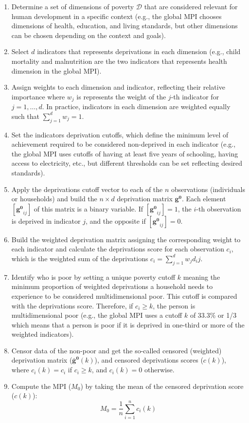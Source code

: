 \begin{enumerate}
\item Determine a set of dimensions of poverty $\mathcal{D}$ that are considered relevant for human development in a specific context (e.g., the global MPI chooses dimensions of health, education, and living standards, but other dimensions can be chosen depending on the context and goals).
\item Select $d$ indicators that represents deprivations in each dimension (e.g., child mortality and malnutrition are the two indicators that represents health dimension in the global MPI).  
\item Assign weights to each dimension and indicator, reflecting their relative importance where $w_j$ is represents the weight of the $j$-th indicator for $j = 1,\ldots,d$. In practice, indicators in each dimension are weighted equally such that $\sum_{j=1}^d w_j = 1$.
\item Set the indicators deprivation cutoffs, which define the minimum level of achievement required to be considered non-deprived in each indicator (e.g., the global MPI uses cutoffs of having at least five years of schooling, having access to electricity, etc., but different thresholds can be set reflecting desired standards). 
\item Apply the deprivations cutoff vector to each of the $n$ observations (individuals or households) and build the $n \times d$ deprivation matrix $\mathbf{g^0}$. Each element $\left[ \mathbf{g^0}_{ij} \right]$ of this matrix is a binary variable. If $\left[ \mathbf{g^0}_{ij} \right] = 1$, the $i$-th observation is deprived in indicator $j$, and the opposite if $\left[ \mathbf{g^0}_{ij} \right] = 0$. 
\item Build the weighted deprivation matrix assigning the corresponding weight to each indicator and calculate the deprivations score for each observation $c_i$, which is the weighted sum of the deprivations $c_i = \sum_{j=1}^d w_j d_ij$.
\item Identify who is poor by setting a unique poverty cutoff $k$ meaning the minimum proportion of weighted deprivations a household needs to experience to be considered multidimensional poor. This cutoff is compared with the deprivations score. Therefore, if $c_i \geq k$, the person is multidimensional poor (e.g., the global MPI uses a cutoff $k$ of 33.3\% or 1/3 which means that a person is poor if it is deprived in one-third or more of the weighted indicators).
\item Censor data of the non-poor and get the so-called censored (weighted) deprivation matrix ($\mathbf{\bar{g}^0}(k)$), and censored deprivations scores ($c(k)$), where $c_i(k) = c_i$ if $c_i \geq k $, and $c_i(k) = 0$ otherwise.

\item Compute the MPI ($M_0$) by taking the mean of the censored deprivation score ($c(k)$):
\[M_0 = \frac{1}{n} \sum_{i=1}^n c_i(k) \]
\end{enumerate}

